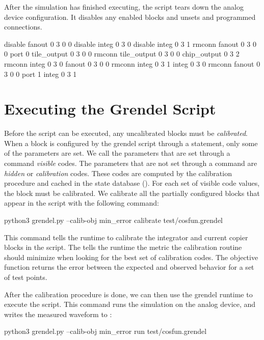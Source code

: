 \begin{snippet}
After the simulation has finished executing, the \grendel script tears down the
analog device configuration. It disables any enabled blocks and unsets and
programmed connections.

\begin{snippet}
disable fanout 0 3 0 0
disable integ 0 3 0
disable integ 0 3 1
rmconn fanout 0 3 0 0 port 0 tile_output 0 3 0 0
rmconn tile_output 0 3 0 0 chip_output 0 3 2
rmconn integ 0 3 0 fanout 0 3 0 0
rmconn integ 0 3 1 integ 0 3 0
rmconn fanout 0 3 0 0 port 1 integ 0 3 1
\end{snippet}

\section{Executing the Grendel Script}

Before the  script can be executed, any uncalibrated blocks
must be \textit{calibrated}. When a block is configured by the grendel script
through a  statement, only some of the parameters are set. We call the
parameters that are set through a \grendel command \textit{visible} codes. The
parameters that are not set through a \grendel command are \textit{hidden}
or \textit{calibration} codes. These codes are computed by the calibration
procedure and cached in the state database (). For each set of
visible code values, the block must be calibrated. We calibrate all the
partially configured blocks that appear in the  script with the
following command:


\begin{snippet}
python3 grendel.py --calib-obj min_error calibrate test/cosfun.grendel
\end{snippet}

This command tells the \grendel runtime to calibrate the integrator and current
copier blocks in the script. The  tells the \grendel runtime the
metric the calibration routine should minimize when looking for the best set of
calibration codes. The  objective function returns the error
between the expected and observed behavior for a set of test points.

After the calibration procedure is done, we can then use the grendel runtime to
execute the script. This command runs the simulation on the analog device, and
writes the measured waveform to :

\begin{snippet}
python3 grendel.py --calib-obj min_error run test/cosfun.grendel
\end{snippet}


\end{snippet}
